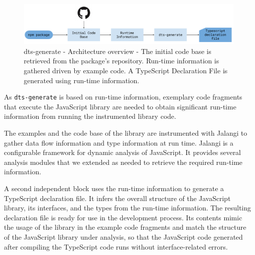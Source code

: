 \documentclass[sigconf]{acmart}
\begin{document}

\begin{figure}[tp]
  \centering
  \includegraphics[width=1\linewidth]{dts-generate-block-diagram.pdf}
  \caption[dts-generate - Architecture overview]{dts-generate - Architecture
      overview - The initial code base is retrieved from the \NPM{} package's
    repository.
    Run-time information is gathered driven by example code.
    A TypeScript Declaration File is generated using run-time
    information.
  } 
  \label{fig:tsd_generation_method_block_diagram}
\end{figure}

As \texttt{dts-generate} is based on run-time information, 
exemplary code fragments that execute the JavaScript library are
needed to obtain 
significant run-time information from running the instrumented library
code.


The examples and the code base of the library are instrumented with
Jalangi \cite{DBLP:conf/sigsoft/SenKBG13} to gather data flow
information and type information at run time. Jalangi is a configurable
framework for dynamic analysis of JavaScript. It provides several
analysis modules that we extended as needed to retrieve the required
run-time information.

A second independent block uses the run-time information to generate a
TypeScript declaration file. It infers the overall structure of the JavaScript
library, its interfaces, and the types from the run-time information. 
The resulting declaration file is ready for use in the development
process. Its contents mimic the usage of the library in the example
code fragments and match the structure of the
JavaScript library under analysis, so that the JavaScript code
generated after compiling the TypeScript code runs without
interface-related errors.
\end{document}

